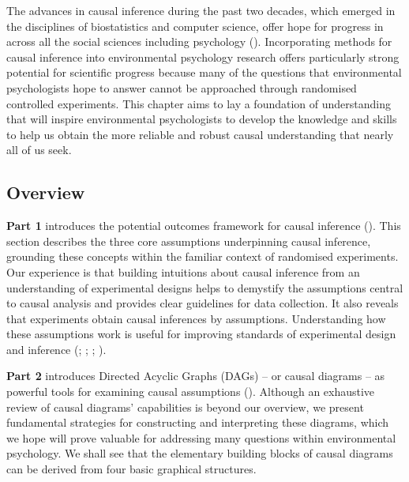 \documentclass[
  singlecolumn]{article}
\begin{document}
The advances in causal inference during the past two decades, which
emerged in the disciplines of biostatistics and computer science, offer
hope for progress in across all the social sciences including psychology
(). Incorporating
methods for causal inference into environmental psychology research
offers particularly strong potential for scientific progress because
many of the questions that environmental psychologists hope to answer
cannot be approached through randomised controlled experiments. This
chapter aims to lay a foundation of understanding that will inspire
environmental psychologists to develop the knowledge and skills to help
us obtain the more reliable and robust causal understanding that nearly
all of us seek.

\subsection{Overview}\label{overview}

\textbf{Part 1} introduces the potential outcomes framework for causal
inference (). This
section describes the three core assumptions underpinning causal
inference, grounding these concepts within the familiar context of
randomised experiments. Our experience is that building intuitions about
causal inference from an understanding of experimental designs helps to
demystify the assumptions central to causal analysis and provides clear
guidelines for data collection. It also reveals that experiments obtain
causal inferences by assumptions. Understanding how these assumptions
work is useful for improving standards of experimental design and
inference (;
;
;
).

\textbf{Part 2} introduces Directed Acyclic Graphs (DAGs) -- or causal
diagrams -- as powerful tools for examining causal assumptions
(). Although an exhaustive review
of causal diagrams' capabilities is beyond our overview, we present
fundamental strategies for constructing and interpreting these diagrams,
which we hope will prove valuable for addressing many questions within
environmental psychology. We shall see that the elementary building
blocks of causal diagrams can be derived from four basic graphical
structures.
\end{document}

